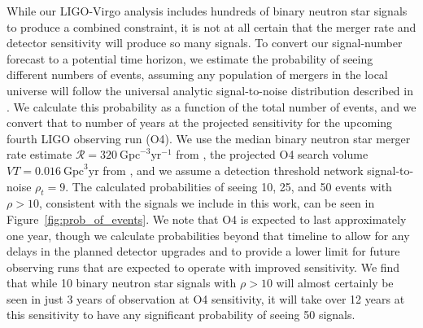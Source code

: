 While our LIGO-Virgo analysis includes hundreds of binary neutron star signals to produce a combined constraint, it is not at all certain that the merger rate and detector sensitivity will produce so many signals. To convert our signal-number forecast to a potential time horizon, we estimate the probability of seeing different numbers of events, assuming any population of mergers in the local universe will follow the universal analytic signal-to-noise distribution described in \cite{Chen:2014yla}. We calculate this probability as a function of the total number of events, and we convert that to number of years at the projected sensitivity for the upcoming fourth LIGO observing run (O4). We use the median binary neutron star merger rate estimate $\mathcal{R}=320~\mathrm{Gpc}^{-3}\mathrm{yr}^{-1}$ from \cite{Abbott:2020gyp}, the projected O4 search volume $VT=0.016~\mathrm{Gpc}^{3}\mathrm{yr}$ from \cite{Aasi:2013wya}, and we assume a detection threshold network signal-to-noise $\rho_{t}=9$. The calculated probabilities of seeing 10, 25, and 50 events with $\rho > 10$, consistent with the signals we include in this work, can be seen in Figure~\ref{fig:prob_of_events}. We note that O4 is expected to last approximately one year, though we calculate probabilities beyond that timeline to allow for any delays in the planned detector upgrades and to provide a lower limit for future observing runs that are expected to operate with improved sensitivity. We find that while 10 binary neutron star signals with $\rho>10$ will almost certainly be seen in just 3 years of observation at O4 sensitivity, it will take over 12 years at this sensitivity to have any significant probability of seeing 50 signals.

